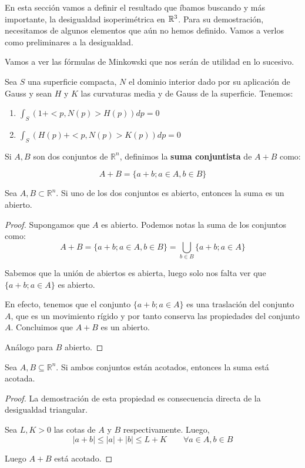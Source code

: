 En esta sección vamos a definir el resultado que íbamos buscando y  más importante, la desigualdad isoperimétrica en $\mathbb{R}^3$. Para su demostración, necesitamos de algunos elementos que aún no hemos definido. Vamos a verlos como preliminares a la desigualdad.

Vamos a ver las fórmulas de Minkowski que nos serán de utilidad en lo sucesivo.
\begin{theorem}
Sea $S$ una superficie compacta, $N$ el dominio interior dado por su aplicación de Gauss y sean $H$ y $K$ las curvaturas media y de Gauss de la superficie. Tenemos:

\begin{enumerate}
    \item $\int_S (1+<p, N(p)>H(p))dp = 0$
    \item $\int_S (H(p)+<p, N(p)>K(p))dp = 0$
\end{enumerate}
\end{theorem}

\begin{definition}
Si $A, B$ son dos conjuntos de $\mathbb{R}^n$, definimos la \textbf{suma conjuntista} de $A+B$ como:

\begin{equation*}
    A+B = \{a+b; a \in A, b \in B\}
\end{equation*}
\end{definition}

\begin{lemma}
Sea $A,B \subset \mathbb{R}^n$. Si uno de los dos conjuntos es abierto, entonces la suma es un abierto.
\end{lemma}
\begin{proof}
Supongamos que $A$ es abierto.
Podemos notas la suma de los conjuntos como:
\begin{equation*}
    A + B = \{a+b; a \in A, b \in B\} = \bigcup_{b \in B} \{a+b; a \in A\}
\end{equation*}

Sabemos que la unión de abiertos es abierta, luego solo nos falta ver que $\{a+b; a \in A\}$ es abierto.

En efecto, tenemos que el conjunto $\{a+b; a \in A\}$ es una traslación del conjunto $A$, que es un movimiento rígido y por tanto conserva las propiedades del conjunto $A$. Concluimos que $A+B$ es un abierto.

Análogo para $B$ abierto.
\end{proof}


\begin{lemma}
Sea $A,B \subseteq \mathbb{R}^n$. Si ambos conjuntos están acotados, entonces la suma está acotada.
\end{lemma}
\begin{proof}
La demostración de esta propiedad es consecuencia directa de la desigualdad triangular.

Sea $L,K > 0$ las cotas de $A$ y $B$ respectivamente. Luego,
\begin{equation*}
    |a+b| \leq |a|+|b| \leq L + K \qquad \forall a \in A, b\in B
\end{equation*}

Luego $A+B$ está acotado.
\end{proof}


